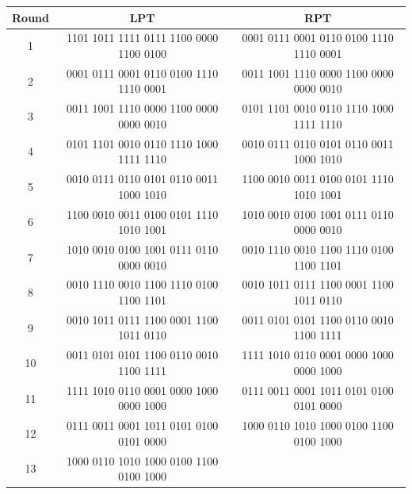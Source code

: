 \documentclass[12pt, letterpaper]{article}
\begin{document}
\begin{table}[ht]
  \centering
  \label{tab:sample-table}
  \begin{tabular}{|c|c|c|}
    \hline
    Round & LPT & RPT  \\
    \hline
    1 &  1101 1011 1111 0111 1100 0000 1100 0100  & 0001 0111 0001 0110 0100 1110 1110 0001
  \\
        \hline
    2 & 0001 0111 0001 0110 0100 1110 1110 0001

 & 0011 1001 1110 0000 1100 0000 0000 0010


  \\
         \hline
    3 &  0011 1001 1110 0000 1100 0000 0000 0010 & 0101 1101 0010 0110 1110 1000 1111 1110
  \\
         \hline
    4 &  0101 1101 0010 0110 1110 1000 1111 1110 & 0010 0111 0110 0101 0110 0011  1000 1010
  \\
         \hline
    5 &  0010 0111 0110 0101 0110 0011  1000 1010 & 1100 0010 0011 0100 0101 1110 1010 1001
  \\
        \hline
    6 & 1100 0010 0011 0100 0101 1110 1010 1001 & 1010 0010 0100 1001 0111 0110 0000 0010
  \\
         \hline
    7 &  1010 0010 0100 1001 0111 0110 0000 0010 & 0010 1110 0010 1100 1110 0100 1100 1101

  \\
         \hline
    8 & 0010 1110 0010 1100 1110 0100 1100 1101

 & 0010 1011 0111 1100 0001 1100 1011 0110

  \\
         \hline
    9 & 0010 1011 0111 1100 0001 1100 1011 0110

 & 0011 0101 0101 1100 0110 0010 1100 1111


  \\
         \hline
    10 & 0011 0101 0101 1100 0110 0010 1100 1111

 & 1111 1010 0110 0001 0000 1000 0000 1000

  \\
         \hline
    11 & 1111 1010 0110 0001 0000 1000 0000 1000

 & 0111 0011 0001 1011 0101 0100 0101 0000

  \\
         \hline
    12 & 0111 0011 0001 1011 0101 0100 0101 0000

 & 1000 0110 1010 1000 0100 1100 0100 1000

  \\
         \hline
    13 & 1000 0110 1010 1000 0100 1100 0100 1000


\end{tabular}
\end{table}
\end{document}
